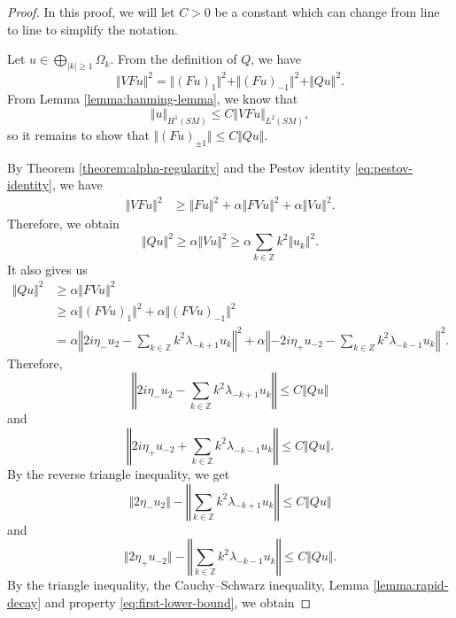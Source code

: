 \documentclass[10pt,a4paper]{amsart}
\newcommand{\Z}{\mathbb{Z}}
\begin{document}
\begin{proof}
In this proof, we will let $C>0$ be a constant which can change from line to line to simplify the notation. 

Let $u\in \bigoplus_{|k|\geq 1}\Omega_k$. From the definition of $Q$, we have
\begin{equation*}
\Vert VF u\Vert^2=\Vert (Fu)_1\Vert^2+\Vert (Fu)_{-1}\Vert^2+\Vert Qu\Vert^2.
\end{equation*}
From Lemma \eqref{lemma:hanming-lemma}, we know that
\begin{equation*}
\Vert u \Vert_{H^1(SM)}\leq C\Vert VF u\Vert_{L^2(SM)},
\end{equation*}
so it remains to show that $\Vert (Fu)_{\pm 1}\Vert \leq C \Vert Q u\Vert$. 

By Theorem \ref{theorem:alpha-regularity} and the Pestov identity \eqref{eq:pestov-identity}, we have
\begin{equation*}
\begin{alignedat}{1}
\Vert VF u\Vert^2 &\geq \Vert Fu\Vert^2+\alpha \Vert FVu \Vert^2+\alpha\Vert Vu\Vert^2.
\end{alignedat}
\end{equation*}
Therefore, we obtain
\begin{equation}\label{eq:first-lower-bound}
\Vert Qu\Vert^2\geq \alpha \Vert Vu\Vert^2\geq \alpha \sum_{k\in \Z}k^2\Vert u_k\Vert^2.
\end{equation}
It also gives us
\begin{equation*}
\begin{alignedat}{1}
\Vert Q u \Vert^2&\geq \alpha \Vert F V u \Vert^2\\
&\geq  \alpha \Vert( F V u)_{1} \Vert^2+  \alpha \Vert( F V u)_{-1} \Vert^2\\
&=\alpha \left\Vert 2i\eta_-u_2-\sum_{k\in \Z}k^2\lambda_{-k+1} u_{k}\right\Vert^2+\alpha\left\Vert -2i \eta_+u_{-2}-\sum_{k\in Z}k^2\lambda_{-k-1} u_{k}\right\Vert^2.
\end{alignedat}
\end{equation*}
Therefore,
$$\left\Vert 2i\eta_- u_{2}- \sum_{k\in \Z}k^2\lambda_{-k+ 1} u_{k}\right\Vert\leq C \Vert Qu\Vert$$
and 
$$\left\Vert 2i \eta_+u_{-2}+\sum_{k\in \Z}k^2\lambda_{-k-1} u_{k}\right\Vert\leq C\Vert Qu\Vert.$$
By the reverse triangle inequality, we get
$$\Vert 2\eta_-u_2\Vert - \left\Vert\sum_{k\in \Z }k^2\lambda_{-k+1}  u_{k}\right\Vert\leq C \Vert Qu\Vert$$
and 
$$\Vert 2 \eta_+u_{-2}\Vert-\left\Vert\sum_{k\in \Z }k^2\lambda_{-k-1} u_{k}\right\Vert\leq C\Vert Qu\Vert.$$
By the triangle inequality, the Cauchy--Schwarz inequality, Lemma \ref{lemma:rapid-decay} and property \eqref{eq:first-lower-bound}, we obtain

\end{proof}
\end{document}
